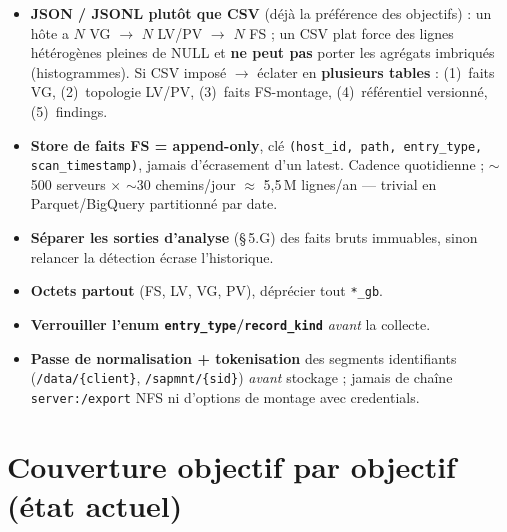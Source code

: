 \documentclass[11pt,a4paper]{article}
\newcommand{\code}[1]{\texttt{#1}}
\begin{document}
\begin{itemize}
  \item \textbf{JSON / JSONL plut\^ot que CSV} (d\'ej\`a la pr\'ef\'erence des objectifs) : un h\^ote a
        $N$ VG $\rightarrow$ $N$ LV/PV $\rightarrow$ $N$ FS ; un CSV plat force des lignes h\'et\'erog\`enes
        pleines de NULL et \textbf{ne peut pas} porter les agr\'egats imbriqu\'es (histogrammes).
        Si CSV impos\'e $\rightarrow$ \'eclater en \textbf{plusieurs tables} : (1)~faits VG,
        (2)~topologie LV/PV, (3)~faits FS-montage, (4)~r\'ef\'erentiel versionn\'e, (5)~findings.
  \item \textbf{Store de faits FS = append-only}, cl\'e
        \code{(host\_id, path, entry\_type, scan\_timestamp)}, jamais d'\'ecrasement d'un \og latest\fg{}.
        Cadence quotidienne ; $\sim$500 serveurs $\times$ $\sim$30 chemins/jour $\approx$ 5,5\,M lignes/an
        --- trivial en Parquet/BigQuery partitionn\'e par date.
  \item \textbf{S\'eparer les sorties d'analyse} (\S\,5.G) des faits bruts immuables, sinon relancer
        la d\'etection \'ecrase l'historique.
  \item \textbf{Octets partout} (FS, LV, VG, PV), d\'epr\'ecier tout \code{*\_gb}.
  \item \textbf{Verrouiller l'enum \code{entry\_type}/\code{record\_kind}} \emph{avant} la collecte.
  \item \textbf{Passe de normalisation + tokenisation} des segments identifiants
        (\code{/data/\{client\}}, \code{/sapmnt/\{sid\}}) \emph{avant} stockage ; jamais de cha\^ine
        \code{server:/export} NFS ni d'options de montage avec credentials.
\end{itemize}

\section{Couverture objectif par objectif (\'etat actuel)}
\end{document}
